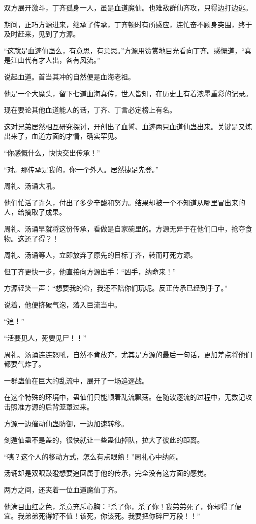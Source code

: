 \begin{this_body}
双方展开激斗，丁齐孤身一人，虽是血道魔仙。也难敌群仙齐攻，只得边打边逃。

期间，正巧方源进来，继承了传承，丁齐顿时有所感应，连忙奋不顾身突围，终于及时赶来，见到了方源。

“这就是血迹仙蛊么，有意思，有意思。”方源用赞赏地目光看向丁齐。感慨道，“真是江山代有才人出，各有风流。”

说起血道。首当其冲的自然便是血海老祖。

他是一个大魔头，留下七道血海真传，世人皆知，在历史上有着浓墨重彩的记录。

现在要论其他血道能人的话，丁齐、丁言必定榜上有名。

这对兄弟居然相互研究探讨，开创出了血誓、血迹两只血道仙蛊出来。关键是又炼出来了，血道方面的才情，确实罕见。

“你感慨什么，快快交出传承！”

“对。那传承是我的，你一个外人。居然捷足先登。”

周礼、汤诵大吼。

他们忙活了许久，付出了多少辛酸和努力。结果却被一个不知道从哪里冒出来的人，给摘取了成果。

周礼、汤诵早就将这份传承，看做是自家碗里的。方源无异于在他们口中，抢夺食物。这还了得？！

周礼、汤诵等人，立即放弃了原先的目标丁齐，转而盯死方源。

但丁齐更快一步，他直接向方源出手：“凶手，纳命来！”

方源轻笑一声：“想要我的命，我还不陪你们玩呢。反正传承已经到手了。”

说着，他便挤破气泡，落入巨流当中。

“追！”

“活要见人，死要见尸！！”

周礼、汤诵连连怒吼，自然不肯放弃，尤其是方源的最后一句话，更加差点将他们都要气炸了。

一群蛊仙在巨大的乱流中，展开了一场追逐战。

在这个特殊的环境中，蛊仙们只能顺着乱流飘荡。在随波逐流的过程中，无数记攻击照准方源的后背笼罩过来。

方源一边催动仙蛊防御，一边加速转移。

剑遁仙蛊不是盖的，很快就让一些蛊仙掉队，拉大了彼此的距离。

“咦？这个人的移动方式，怎么有点眼熟！”周礼心中纳闷。

汤诵却是双眼鼓瞪想要追回属于他的传承，完全没有这方面的感觉。

两方之间，还夹着一位血道魔仙丁齐。

他满目血红之色，杀意充斥心胸：“杀了你，杀了你！我弟弟死了，你却得了便宜。我弟弟死得好不值！该死，你该死。我要把你碎尸万段！！”


\end{this_body}
